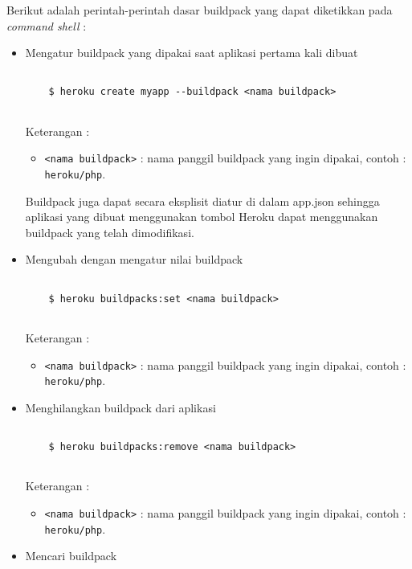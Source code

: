 Berikut adalah perintah-perintah dasar buildpack yang dapat diketikkan pada \textit{command shell} :
\begin{itemize}
\item Mengatur buildpack yang dipakai saat aplikasi pertama kali dibuat
\begin{lstlisting}

	$ heroku create myapp --buildpack <nama buildpack>
	
\end{lstlisting}
Keterangan :
\begin{itemize}
\item \texttt{<nama buildpack>} : nama panggil buildpack yang ingin dipakai, contoh : \texttt{heroku/php}.
\end{itemize}

Buildpack juga dapat secara eksplisit diatur di dalam app.json sehingga aplikasi yang dibuat menggunakan tombol Heroku dapat menggunakan buildpack yang telah dimodifikasi.

\item Mengubah dengan mengatur nilai buildpack

\begin{lstlisting}

	$ heroku buildpacks:set <nama buildpack>
	
\end{lstlisting}
Keterangan :
\begin{itemize}
\item \texttt{<nama buildpack>} : nama panggil buildpack yang ingin dipakai, contoh : \texttt{heroku/php}.
\end{itemize}

\item Menghilangkan buildpack dari aplikasi

\begin{lstlisting}

	$ heroku buildpacks:remove <nama buildpack>
	
\end{lstlisting}
Keterangan :
\begin{itemize}
\item \texttt{<nama buildpack>} : nama panggil buildpack yang ingin dipakai, contoh : \texttt{heroku/php}.
\end{itemize}

\item Mencari buildpack

\begin{lstlisting}


\end{lstlisting}
\end{itemize}
